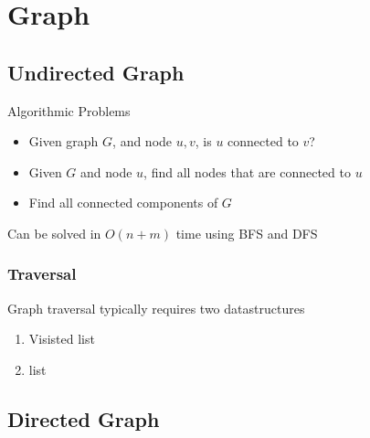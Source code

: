 \chapter{Graph}

\section{Undirected Graph}

  Algorithmic Problems

  \begin{itemize}
    \item Given graph $ G $, and node $ u, v $, is $ u $ connected to $ v $?
    \item Given $ G $ and node $ u $, find all nodes that are connected to $ u $
    \item Find all connected components of $ G $
  \end{itemize}

  Can be solved in $ O\left( n + m \right) $ time using BFS and DFS

  \subsection{Traversal}

    Graph traversal typically requires two datastructures

    \begin{enumerate}
      \item Visisted list
      \item {} list
    \end{enumerate}

\section{Directed Graph}

